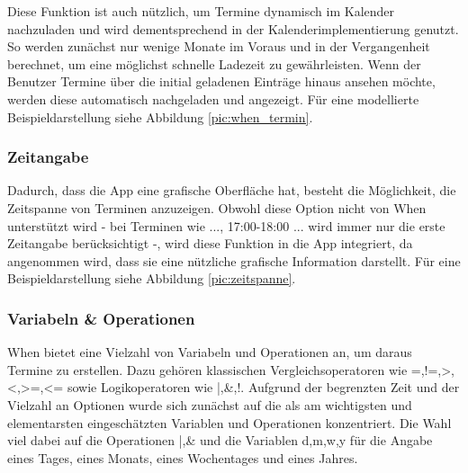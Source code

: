 Diese Funktion ist auch nützlich, um Termine dynamisch im Kalender nachzuladen und wird dementsprechend in der Kalenderimplementierung genutzt. So werden zunächst nur wenige Monate im Voraus und in der Vergangenheit berechnet, um eine möglichst schnelle Ladezeit zu gewährleisten. Wenn der Benutzer Termine über die initial geladenen Einträge hinaus ansehen möchte, werden diese automatisch nachgeladen und angezeigt.%
\newline%
Für eine modellierte Beispieldarstellung siehe Abbildung \ref{pic:when_termin}.
%
%
%
%
%
\subsubsection{Zeitangabe}
Dadurch, dass die App eine grafische Oberfläche hat, besteht die Möglichkeit, die Zeitspanne von Terminen anzuzeigen. Obwohl diese Option nicht von When unterstützt wird - bei Terminen wie \glqq..., 17:00-18:00 ...\grqq{} wird immer nur die erste Zeitangabe berücksichtigt -, wird diese Funktion in die App integriert, da angenommen wird, dass sie eine nützliche grafische Information darstellt.%
\newline%
Für eine Beispieldarstellung siehe Abbildung \ref{pic:zeitspanne}.
%
%
%
%
%
\subsubsection{Variabeln \& Operationen}
When bietet eine Vielzahl von Variabeln und Operationen an, um daraus Termine zu erstellen. Dazu gehören klassischen Vergleichsoperatoren wie \glqq =,!=,>,<,>=,<=\grqq{} sowie Logikoperatoren wie \glqq|,\&,!\grqq{}. %
Aufgrund der begrenzten Zeit und der Vielzahl an Optionen wurde sich zunächst auf die als am wichtigsten und elementarsten eingeschätzten Variablen und Operationen konzentriert. Die Wahl viel dabei auf die Operationen \glqq|,\&\grqq{} und die Variablen \glqq d,m,w,y\grqq{} für die Angabe eines Tages, eines Monats, eines Wochentages und eines Jahres.%
%
%
%
%
%
